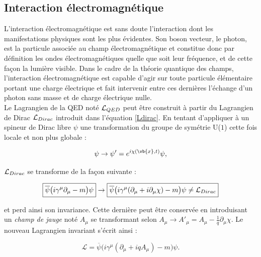         \subsection{Interaction électromagnétique}

        L'interaction électromagnétique est sans doute l'interaction dont les manifestations physiques sont les plus évidentes. Son boson vecteur, le photon, est la particule associée au champ électromagnétique et constitue donc par définition les ondes électromagnétiques quelle que soit leur fréquence, et de cette façon la lumière visible. Dans le cadre de la théorie quantique des champs, l'interaction électromagnétique est capable d'agir sur toute particule élémentaire portant une charge électrique et fait intervenir entre ces dernières l'échange d'un photon sans masse et de charge électrique nulle. \\

        Le Lagrangien de la QED noté $\mathcal{L}_{\tiny QED}$ peut être construit à partir du Lagrangien de Dirac $\mathcal{L}_{\tiny Dirac}$ introduit dans l'équation \ref{Ldirac}. En tentant d'appliquer à un spineur de Dirac libre $\psi$ une transformation du groupe de symétrie U($1$) cette fois locale et non plus globale :

        \begin{equation}
            \psi\rightarrow\psi'=e^{i\chi(\vb{x},t)}\psi,
        \label{localU1}
        \end{equation}

        $\mathcal{L}_{\tiny Dirac}$ se transforme de la façon suivante :

        \begin{equation*}
            \boxed{\overline{\psi}\bigl(i\gamma^{\mu}\partial_{\mu}-m\bigr)\psi}\rightarrow\boxed{\overline{\psi}\bigl(i\gamma^{\mu}(\partial_{\mu}+i\partial_{\mu}\chi)-m\bigr)\psi\ne\mathcal{L}_{\tiny Dirac}}
        \end{equation*}

        et perd ainsi son invariance. Cette dernière peut être conservée en introduisant un \textit{champ de jauge} noté $A_{\mu}$ se transformant selon $A_{\mu}\rightarrow A'_{\mu}=A_{\mu}-\frac{1}{q}\partial_{\mu}\chi$. Le nouveau Lagrangien invariant s'écrit ainsi :

        \begin{equation}
            \mathcal{L}=\overline{\psi}\bigl(i\gamma^{\mu}(\partial_{\mu}+iqA_{\mu})-m\bigr)\psi.
        \end{equation}

